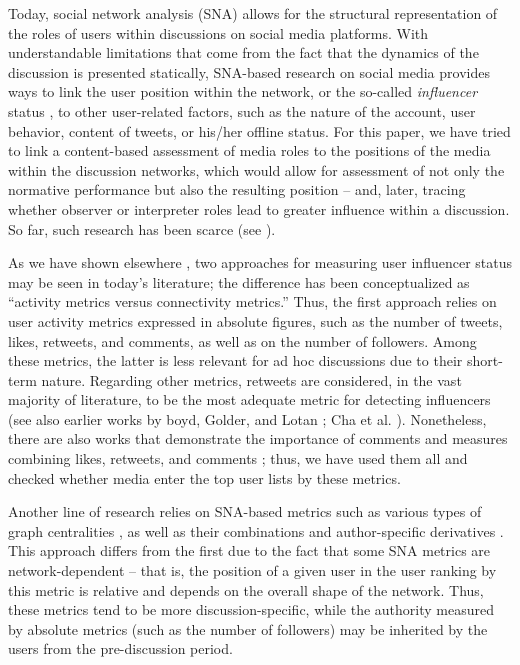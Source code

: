 Today, social network analysis (SNA) allows for the structural representation of the roles of users within discussions on social media platforms. With understandable limitations that come from the fact that the dynamics of the discussion is presented statically, SNA-based research on social media provides ways to link the user position within the network, or the so-called \textit{influencer} status \cite{PattersonGrennyMaxfield}, to other user-related factors, such as the nature of the account, user behavior, content of tweets, or his/her offline status. For this paper, we have tried to link a content-based assessment of media roles to the positions of the media within the discussion networks, which would allow for assessment of not only the normative performance but also the resulting position -- and, later, tracing whether observer or interpreter roles lead to greater influence within a discussion. So far, such research has been scarce (see \cite{EnliSimonsen}).

As we have shown elsewhere \cite{BodrunovaLitvinenkoBlekanov2016,BodrunovaLitvinenkoBlekanov2017}, two approaches for measuring user influencer status may be seen in today’s literature; the difference has been conceptualized as “activity metrics versus connectivity metrics.” Thus, the first approach relies on user activity metrics expressed in absolute figures, such as the number of tweets, likes, retweets, and comments, as well as on the number of followers. Among these metrics, the latter is less relevant for ad hoc discussions due to their short-term nature. Regarding other metrics, retweets are considered, in the vast majority of literature, to be the most adequate metric for detecting influencers \cite{FrebergGrahamMcGaughey,BrunsBurgess2015,SajuriaVanHeerdeHudsonHudson} (see also earlier works by boyd, Golder, and Lotan \cite{BoydGolderLotan}; Cha et al. \cite{ChaBenevenutoHaddadi}). Nonetheless, there are also works that demonstrate the importance of comments and measures combining likes, retweets, and comments \cite{Vis}; thus, we have used them all and checked whether media enter the top user lists by these metrics.

Another line of research relies on SNA-based metrics such as various types of graph centralities \cite{ChaBenevenutoHaddadi,DuboisGaffney}, as well as their combinations \cite{GonzalezBailonBorgeHolthoeferMoreno} and author-specific derivatives \cite{MairederWeeksDeZuniga}. This approach differs from the first due to the fact that some SNA metrics are network-dependent -- that is, the position of a given user in the user ranking by this metric is relative and depends on the overall shape of the network. Thus, these metrics tend to be more discussion-specific, while the authority measured by absolute metrics (such as the number of followers) may be inherited by the users from the pre-discussion period.

